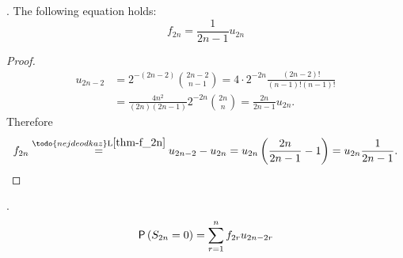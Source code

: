 \begin{lemma}\label{lemma-f_2n=frac}
  \Lrws. The following equation holds:
 \[
 f_{2n}=\frac{1}{2n-1}u_{2n}
 \]
\end{lemma}
\begin{proof}
 \[
  \begin{split}
    u_{2n-2} & =2^{-(2n-2)}\binom{2n-2}{n-1}=4\cdot 2^{-2n} \frac{ \left( 2n-2 \right) !}{ \left( n-1 \right) ! \left( n-1 \right) !}\\
    & =\frac{4n^2}{ \left( 2n \right) \left( 2n-1 \right) }2^{-2n}\binom{2n}{n}
    =\frac{2n}{2n-1}u_{2n}.
  \end{split}
 \]
 Therefore
 \[
 f_{2n} \overset{\todo{nejde odkaz}\text{L}\ref{thm-f_2n}}{=} u_{2n-2}-u_{2n}=u_{2n} \left( \frac{2n}{2n-1}-1 \right)
 =u_{2n}\frac{1}{2n-1}.
 \]
\end{proof}

\begin{lemma}[Decomposition of $f_n$]\label{lemma-decomposition_f_n}
  \Lrws.
  \[
  \pr\left(S_{2n}=0\right)=\suma[r][1][n] f_{2r}u_{2n-2r}
  \]
\end{lemma}

